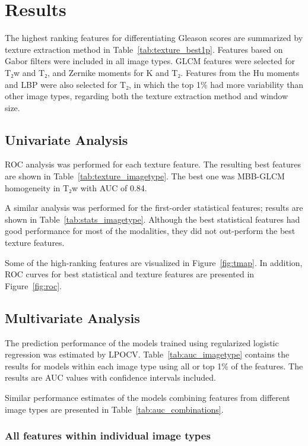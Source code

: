 \section{Results}

The highest ranking features for differentiating Gleason scores are summarized
by texture extraction method in Table~\ref{tab:texture_best1p}. Features based
on Gabor filters were included in all image types. GLCM features were selected
for T₂w and T₂, and Zernike moments for K and T₂. Features from the Hu
moments and LBP were also selected for T₂, in which the top 1\% had more
variability than other image types, regarding both the texture extraction method
and window size.


\subsection{Univariate Analysis}

ROC analysis was performed for each texture feature. The resulting best features
are shown in Table~\ref{tab:texture_imagetype}. The best one was MBB-GLCM
homogeneity in T₂w with AUC of 0.84.

A similar analysis was performed for the first-order statistical features;
results are shown in Table~\ref{tab:stats_imagetype}. Although the best
statistical features had good performance for most of the modalities, they did
not out-perform the best texture features.

Some of the high-ranking features are visualized in Figure~\ref{fig:tmap}. In
addition, ROC curves for best statistical and texture features are presented in
Figure~\ref{fig:roc}.


\subsection{Multivariate Analysis}

The prediction performance of the models trained using regularized logistic
regression was estimated by LPOCV\@. Table~\ref{tab:auc_imagetype} contains the
results for models within each image type using all or top 1\% of the features.
The results are AUC values with confidence intervals included.

Similar performance estimates of the models combining features from different
image types are presented in Table~\ref{tab:auc_combinations}.


\subsubsection{All features within individual image types}

